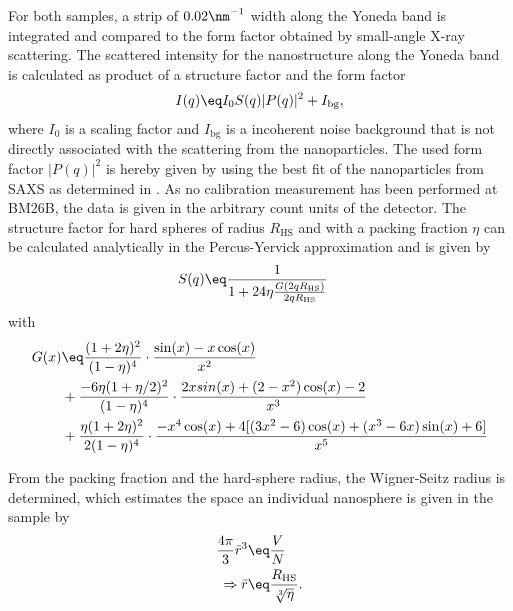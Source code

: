 \documentclass[\main/dresen_thesis.tex]{subfiles}
\begin{document}
    For both samples, a strip of $0.02 \nm^{-1}$ width along the Yoneda band is integrated and compared to the form factor obtained by small-angle X-ray scattering.
    The scattered intensity for the nanostructure along the Yoneda band is calculated as product of a structure factor and the form factor
    \begin{align}
      I(q) \eq I_0 S(q) |P(q)|^2 + I_\mathrm{bg},
    \end{align}
    where $I_0$ is a scaling factor and $I_\mathrm{bg}$ is a incoherent noise background that is not directly associated with the scattering from the nanoparticles.
    The used form factor $|P(q)|^2$ is hereby given by using the best fit of the nanoparticles from SAXS as determined in .
    As no calibration measurement has been performed at BM26B, the data is given in the arbitrary count units of the detector.
    The structure factor for hard spheres of radius $R_\mathrm{HS}$ and with a packing fraction $\eta$ can be calculated analytically in the Percus-Yervick approximation \cite{Percus_1958_Analy, Wertheim_1963_Exact, Pedersen_1997_Analy} and is given by
    \begin{align}
      S(q) &\eq \frac{1}{1 + 24 \eta \frac{G(2 q R_\mathrm{HS})}{2 q R_\mathrm{HS}} }
    \end{align}
    with
    \begin{align}
      \begin{split}
        G(x)   &\eq \frac{(1 + 2\eta )^2}{(1 - \eta )^4} \cdot \frac{ \sin(x) - x \cos(x)}{x^2}\\
               & + \frac {-6 \eta (1 + \eta / 2)^2}{(1 - \eta )^4} \cdot \frac{2 x sin(x) + (2 - x^2) \cos(x) - 2}{x^3}\\
               & + \frac{\eta (1 + 2\eta )^2}{2(1 - \eta )^4} \cdot \frac{-x^4 \cos(x) + 4 [(3 x^2 - 6) \cos(x) +(x^3 - 6 x) \sin(x) + 6]}{x^5}\\
      \end{split}
    \end{align}

    From the packing fraction and the hard-sphere radius, the Wigner-Seitz radius is determined, which estimates the space an individual nanosphere is given in the sample by
    \begin{align}
      \begin{split}
        \label{eq:looselyPackedNP:layers:wignerSeitz}
        \frac{4 \pi}{3} \bar{r}^3 &\eq \frac{V}{N}\\
        \Rightarrow \bar{r}       &\eq \frac{R_\mathrm{HS}}{\sqrt[3]{\eta}}.
      \end{split}
    \end{align}
\end{document}
